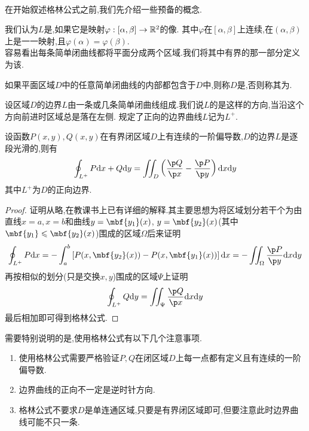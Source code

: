 \documentclass{ctexart}
\begin{document}
\pagestyle{empty}
\begin{center}\large{}\end{center}
\\
在开始叙述格林公式之前,我们先介绍一些预备的概念.
\begin{definition}[1.1 定义:简单闭曲线]
    我们认为$L$是,如果它是映射$\varphi:[\alpha,\beta]\to\mathbb{R}^2$的像.%
    其中$\varphi$在$[\alpha,\beta]$上连续,在$(\alpha,\beta)$上是一一映射,且$\varphi(\alpha)=\varphi(\beta)$.\\
    容易看出每条简单闭曲线都将平面分成两个区域.我们将其中有界的那一部分定义为该.
\end{definition}
\begin{definition}[1.2 定义:单连通区域和多连通区域]
    如果平面区域$D$中的任意简单闭曲线的内部都包含于$D$中,则称$D$是,否则称其为.
\end{definition}
\begin{definition}[1.3 定义:边界曲线的正向]
    设区域$D$的边界$L$由一条或几条简单闭曲线组成.我们说$L$的是这样的方向,当沿这个方向前进时区域总是落在左侧.%
    规定了正向的边界曲线$L$记为$L^+$.
\end{definition}\noindent
{}
\begin{formal}[2.1 格林公式]
    设函数$P(x,y),Q(x,y)$在有界闭区域$D$上有连续的一阶偏导数,$D$的边界$L$是逐段光滑的,则有
    \[\oint_{L^+}P\di x+Q\di y=\iint_D\left(\dfrac{\p Q}{\p x}-\dfrac{\p P}{\p y}\right)\dx\di y\]
    其中$L^+$为$D$的正向边界.
\end{formal}\noindent
\begin{proof}
    证明从略,在教课书上已有详细的解释.其主要思想为将区域划分若干个为由直线$x=a,x=b$和曲线$y=\mbf{y_1}(x)$,%
    $y=\mbf{y_2}(x)$(其中$\mbf{y_1}\leqslant\mbf{y_2}(x)$)围成的区域$\Omega$后来证明
    \[\oint_{L^+}P\di x=-\int_a^b\left[P(x,\mbf{y_2}(x))-P(x,\mbf{y_1}(x))\right]\di x=-\iint_{\Omega}\dfrac{\p P}{\p y}\dx\di y\]
    再按相似的划分(只是交换$x,y$)围成的区域$\Psi$上证明
    \[\oint_{L^+}Q\di y=\iint_{\Psi}\dfrac{\p Q}{\p x}\dx\di y\]
    最后相加即可得到格林公式.
\end{proof}\noindent
需要特别说明的是,使用格林公式有以下几个注意事项.
\begin{theorem}[2.2 使用格林公式的注意事项]
    \begin{enumerate}[label=\tbf{(\arabic*)}]
        \item 使用格林公式需要严格验证$P,Q$在闭区域$D$上每一点都有定义且有连续的一阶偏导数.
        \item 边界曲线的正向不一定是逆时针方向.
        \item 格林公式不要求$D$是单连通区域,只要是有界闭区域即可,但要注意此时边界曲线可能不只一条.
    \end{enumerate}
\end{theorem}\noindent
\end{document}
